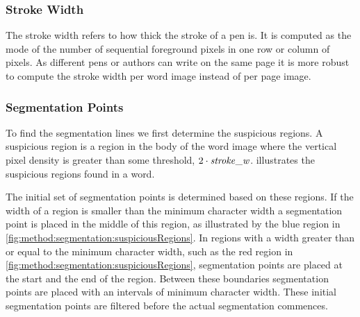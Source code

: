 \subsubsection{Stroke Width}
\label{sss:method:segmentaton:strokwidth}
	The stroke width refers to how thick the stroke of a pen is. It is computed as the mode of the number of sequential foreground pixels in one row or column of pixels. As different pens or authors can write on the same page it is more robust to compute the stroke width per word image instead of per page image.

\subsubsection{Segmentation Points}
\label{sss:method:segmentaton:segmentationpoints}
	To find the segmentation lines we first determine the suspicious regions. A suspicious region is a region in the body of the word image where the vertical pixel density is greater than some threshold, $2 \cdot \mathit{stroke\_w}$.  illustrates the suspicious regions found in a word. 

	The initial set of segmentation points is determined based on these regions. If the width of a region is smaller than the minimum character width a segmentation point is placed in the middle of this region, as illustrated by the blue region in \cref{fig:method:segmentation:suspiciousRegions}. In regions with a width greater than or equal to the minimum character width, such as the red region in \cref{fig:method:segmentation:suspiciousRegions}, segmentation points are placed at the start and the end of the region. Between these boundaries segmentation points are placed with an intervals of minimum character width. These initial segmentation points are filtered before the actual segmentation commences.

